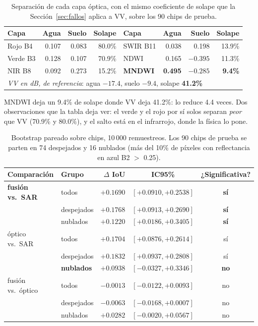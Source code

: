\documentclass{article}
\begin{document}
\begin{table}[!htbp]
\centering
\caption{Separación de cada capa óptica, con el mismo coeficiente de solape que
la Sección~\ref{sec:fallos} aplica a VV, sobre los 90 chips de prueba.}
\label{tab:separacion}
\small
\begin{tabular}{lrrr@{\qquad}lrrr}
\toprule
Capa & Agua & Suelo & Solape & Capa & Agua & Suelo & Solape \\
\midrule
Rojo B4 & 0.107 & 0.083 & 80.0\% & SWIR B11 & 0.038 & 0.198 & 13.9\% \\
Verde B3 & 0.128 & 0.107 & 70.9\% & NDWI & 0.165 & $-0.395$ & 11.3\% \\
NIR B8 & 0.092 & 0.273 & 15.2\% & \textbf{MNDWI} & \textbf{0.495} & $\mathbf{-0.285}$ & \textbf{9.4\%} \\
\midrule
\multicolumn{8}{l}{\emph{VV en dB, de referencia}: agua $-17.4$, suelo $-9.4$, solape \textbf{41.2\%}} \\
\bottomrule
\end{tabular}
\end{table}

MNDWI deja un 9.4\% de solape donde VV deja 41.2\%: lo reduce 4.4 veces.
Dos observaciones que la tabla deja ver: el
verde y el rojo por sí solos separan \emph{peor} que VV (70.9\% y 80.0\%), y el
salto está en el infrarrojo, donde la física lo pone.

\begin{table}[!htbp]
\centering
\caption{Bootstrap pareado sobre chips, 10\,000 remuestreos. Los 90 chips de
prueba se parten en 74 despejados y 16 nublados (más del 10\% de píxeles con
reflectancia en azul B2 $>$ 0.25).}
\label{tab:fusion}
\small
\begin{tabular}{llrcc}
\toprule
Comparación & Grupo & $\Delta$ IoU & IC95\% & ¿Significativa? \\
\midrule
\textbf{fusión vs.\ SAR} & todos & $+0.1690$ & $[+0.0910, +0.2538]$ & \textbf{sí} \\
 & despejados & $+0.1768$ & $[+0.0913, +0.2690]$ & \textbf{sí} \\
 & nublados & $+0.1220$ & $[+0.0186, +0.3405]$ & \textbf{sí} \\
\midrule
óptico vs.\ SAR & todos & $+0.1704$ & $[+0.0876, +0.2614]$ & sí \\
 & despejados & $+0.1832$ & $[+0.0937, +0.2808]$ & sí \\
 & \textbf{nublados} & $+0.0938$ & $\mathbf{[-0.0327, +0.3346]}$ & \textbf{no} \\
\midrule
fusión vs.\ óptico & todos & $-0.0013$ & $[-0.0122, +0.0093]$ & no \\
 & despejados & $-0.0063$ & $[-0.0168, +0.0007]$ & no \\
 & nublados & $+0.0282$ & $[-0.0020, +0.0567]$ & no \\
\bottomrule
\end{tabular}
\end{table}
\end{document}
